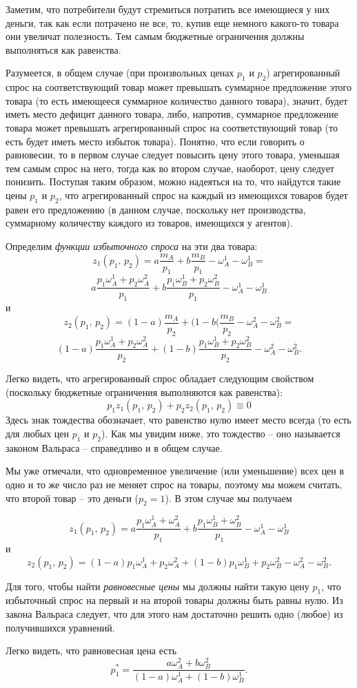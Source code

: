 Заметим, что потребители будут стремиться
потратить все имеющиеся у них деньги, так как если потрачено не все,
то, купив еще немного какого-то товара они увеличат полезность. Тем
самым бюджетные ограничения должны выполняться как равенства.

Разумеется, в общем случае (при произвольных ценах $p_1$ и $p_2$)
агрегированный спрос на соответствующий товар может превышать
суммарное предложение этого товара (то есть имеющееся суммарное
количество данного товара), значит, будет иметь место дефицит
данного товара, либо, напротив, суммарное предложение товара
может превышать агрегированный спрос на соответствующий товар
(то есть будет иметь место избыток товара). Понятно, что если
говорить о равновесии, то в первом случае следует повысить цену
этого товара, уменьшая тем самым
спрос на него, тогда как во втором случае, наоборот, цену
следует понизить. Поступая таким образом, можно надеяться на то,
что найдутся такие цены $p_1$ и $p_2$, что агрегированный спрос
на каждый из имеющихся товаров будет равен его предложению (в данном
случае, поскольку нет производства, суммарному количеству каждого из товаров,
имеющихся у агентов).

Определим \emph{функции избыточного спроса} на эти два товара:
$$z_1(p_1,\,p_2)=a\frac{m_A}{p_1}+b\frac{m_B}{p_1}-\omega^1_A-\omega^1_B=$$
$$a\frac{p_1\omega^1_A+p_2\omega^2_A}{p_1}+b\frac{p_1\omega^1_B+p_2\omega^2_B}{p_1}-
\omega^1_A-\omega^1_B$$ и
$$z_2(p_1,\,p_2)=(1-a)\frac{m_A}{p_2}+(1-b(\frac{m_B}{p_2}-\omega^2_A-\omega^2_B=$$
$$(1-a)\frac{p_1\omega^1_A+p_2\omega^2_A}{p_2}+(1-b)\frac{p_1\omega^1_B+p_2\omega^2_B}{p_2}-
\omega^2_A-\omega^2_B.$$

Легко видеть, что агрегированный спрос обладает следующим свойством
(поскольку бюджетные ограничения выполняются как равенства):
$$p_1z_1(p_1,\,p_2)+p_2z_2(p_1,\,p_2)\equiv0$$
Здесь знак тождества обозначает, что равенство нулю имеет место
всегда (то есть для любых цен $p_1$ и $p_2$). Как мы увидим ниже,
это тождество -- оно называется законом Вальраса -- справедливо и
в общем случае.

Мы уже отмечали, что одновременное увеличение (или уменьшение) всех
цен в одно и то же число раз не меняет спрос на товары, поэтому мы
можем считать, что второй товар -- это деньги ($p_2=1$). В этом
случае мы получаем

$$z_1(p_1,\,p_2)=a\frac{p_1\omega^1_A+\omega^2_A}{p_1}+b\frac{p_1\omega^1_B+\omega^2_B}{p_1}-
\omega^1_A-\omega^1_B$$ и
$$z_2(p_1,\,p_2)=(1-a){p_1\omega^1_A+p_2\omega^2_A}+
(1-b){p_1\omega^1_B+p_2\omega^2_B}-\omega^2_A-\omega^2_B.$$

Для того, чтобы найти \emph{равновесные цены} мы должны найти такую
цену $p_1$, что избыточный спрос на первый и на второй товары должны
быть равны нулю. Из закона Вальраса следует, что для этого нам достаточно
решить одно (любое) из получившихся уравнений.

Легко видеть, что равновесная цена есть
$$p^*_1=\frac{a\omega^2_A+b\omega^2_B}{(1-a)\omega^1_A+(1-b)\omega^1_B}.$$
